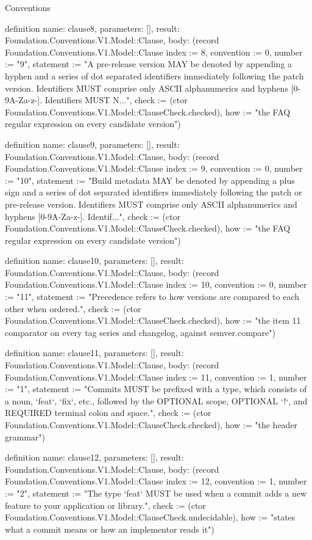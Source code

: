 \begin{lexlean}{Conventions}
\begin{semanticmodule}
definition{
  name: clause8,
  parameters: [],
  result: Foundation.Conventions.V1.Model::Clause,
  body: (record Foundation.Conventions.V1.Model::Clause {index := 8, convention := 0, number := "9", statement := "A pre-release version MAY be denoted by appending a hyphen and a series of dot separated identifiers immediately following the patch version. Identifiers MUST comprise only ASCII alphanumerics and hyphens [0-9A-Za-z-]. Identifiers MUST N...", check := (ctor Foundation.Conventions.V1.Model::ClauseCheck.checked), how := "the FAQ regular expression on every candidate version"})
}

definition{
  name: clause9,
  parameters: [],
  result: Foundation.Conventions.V1.Model::Clause,
  body: (record Foundation.Conventions.V1.Model::Clause {index := 9, convention := 0, number := "10", statement := "Build metadata MAY be denoted by appending a plus sign and a series of dot separated identifiers immediately following the patch or pre-release version. Identifiers MUST comprise only ASCII alphanumerics and hyphens [0-9A-Za-z-]. Identif...", check := (ctor Foundation.Conventions.V1.Model::ClauseCheck.checked), how := "the FAQ regular expression on every candidate version"})
}

definition{
  name: clause10,
  parameters: [],
  result: Foundation.Conventions.V1.Model::Clause,
  body: (record Foundation.Conventions.V1.Model::Clause {index := 10, convention := 0, number := "11", statement := "Precedence refers to how versions are compared to each other when ordered.", check := (ctor Foundation.Conventions.V1.Model::ClauseCheck.checked), how := "the item 11 comparator on every tag series and changelog, against semver.compare"})
}

definition{
  name: clause11,
  parameters: [],
  result: Foundation.Conventions.V1.Model::Clause,
  body: (record Foundation.Conventions.V1.Model::Clause {index := 11, convention := 1, number := "1", statement := "Commits MUST be prefixed with a type, which consists of a noun, `feat`, `fix`, etc., followed by the OPTIONAL scope, OPTIONAL `!`, and REQUIRED terminal colon and space.", check := (ctor Foundation.Conventions.V1.Model::ClauseCheck.checked), how := "the header grammar"})
}

definition{
  name: clause12,
  parameters: [],
  result: Foundation.Conventions.V1.Model::Clause,
  body: (record Foundation.Conventions.V1.Model::Clause {index := 12, convention := 1, number := "2", statement := "The type `feat` MUST be used when a commit adds a new feature to your application or library.", check := (ctor Foundation.Conventions.V1.Model::ClauseCheck.undecidable), how := "states what a commit means or how an implementor reads it"})
}


\end{semanticmodule}
\end{lexlean}
